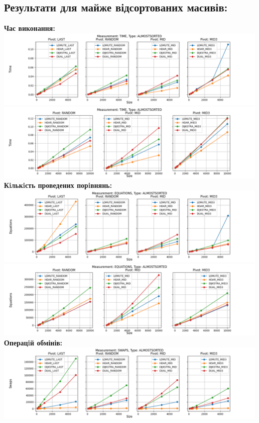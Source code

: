 \documentclass{article}
\begin{document}
    \subsection{Результати для майже відсортованих масивів:}
    \textbf{Час виконання:}
    \newline
        \includegraphics[scale=0.5]{almostsorted_Time_6_numbers.png}
        \includegraphics[scale=0.5]{almostsorted_Time_3_pivots_7_numbers.png}
    \textbf{Кiлькiсть проведених порiвнянь:}
    \newline
        \includegraphics[scale=0.5]{almostsorted_Equations_6_numbers.png}
        \includegraphics[scale=0.5]{almostsorted_Equations_3_pivots_7_numbers.png}
        \newline
    \textbf{Операцiй обмінів:}
    \newline
        \includegraphics[scale=0.5]{almostsorted_Swaps_6_numbers.png}
\end{document}
